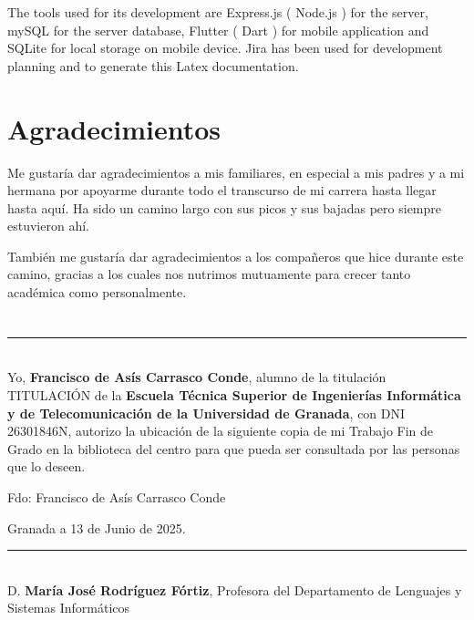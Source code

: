 The tools used for its development are Express.js ( Node.js ) for the server, mySQL for the server database, Flutter ( Dart ) for mobile application and SQLite for local storage on mobile device. Jira has been used for development planning and to generate this Latex documentation.

\chapter*{Agradecimientos}

Me gustaría dar agradecimientos a mis familiares, en especial a mis padres y a mi hermana por apoyarme durante todo el transcurso de mi carrera hasta llegar hasta aquí. Ha sido un camino largo con sus picos y sus bajadas pero siempre estuvieron ahí.

También me gustaría dar agradecimientos a los compañeros que hice durante este camino, gracias a los cuales nos nutrimos mutuamente para crecer tanto académica como personalmente.

\chapter*{}
\thispagestyle{empty}

\noindent\rule[-1ex]{\textwidth}{2pt}\\[4.5ex]

Yo, \textbf{Francisco de Asís Carrasco Conde}, alumno de la titulación TITULACIÓN de la \textbf{Escuela Técnica Superior
de Ingenierías Informática y de Telecomunicación de la Universidad de Granada}, con DNI 26301846N, autorizo la
ubicación de la siguiente copia de mi Trabajo Fin de Grado en la biblioteca del centro para que pueda ser
consultada por las personas que lo deseen.

\vspace{6cm}

\noindent Fdo: Francisco de Asís Carrasco Conde

\vspace{2cm}

\begin{flushright}
Granada a 13 de Junio de 2025.
\end{flushright}

\thispagestyle{empty}

\noindent\rule[-1ex]{\textwidth}{2pt}\\[4.5ex]

D. \textbf{María José Rodríguez Fórtiz}, Profesora del Departamento de Lenguajes y Sistemas Informáticos

